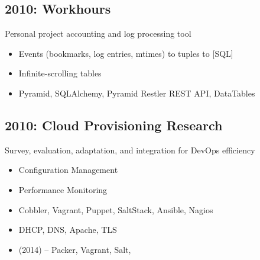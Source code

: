 \documentclass[letter,,openany,oneside,english]{sphinxhowto}
\begin{document}
\subsection{2010: Workhours}
\label{\detokenize{resume:workhours}}
\begin{DUlineblock}{0em}
\item[] Personal project accounting and log processing tool
\end{DUlineblock}
\begin{itemize}
\item {} 
Events (bookmarks, log entries, mtimes) to tuples to {[}SQL{]}

\item {} 
Infinite-scrolling tables

\item {} 
Pyramid, SQLAlchemy, Pyramid Restler REST API, DataTables

\end{itemize}


\subsection{2010: Cloud Provisioning Research}
\label{\detokenize{resume:cloud-provisioning-research}}
\begin{DUlineblock}{0em}
\item[] Survey, evaluation, adaptation, and integration for DevOps efficiency
\end{DUlineblock}
\begin{itemize}
\item {} 
Configuration Management

\item {} 
Performance Monitoring

\item {} 
Cobbler, Vagrant, Puppet, SaltStack, Ansible, Nagios

\item {} 
DHCP, DNS, Apache, TLS

\item {} 
 (2014) -- Packer, Vagrant, Salt, 

\end{itemize}
\end{document}
